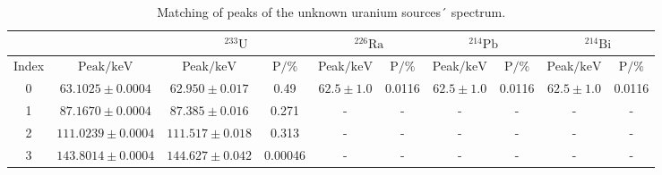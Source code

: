 \begin{table}[h!]
	\centering
	\caption{Matching of peaks of the unknown uranium sources´ spectrum.}
	\label{tab:urmatching}
	\begin{adjustbox}{width=1.3\textwidth, center}
		\begin{tabular}{S[table-format=2.0] S[table-format=4.4] S[table-format=3.3] S[table-format=1.5] S[table-format=3.2] S[table-format=1.4] S[table-format=3.2] S[table-format=1.4] S[table-format=3.2] S[table-format=1.4]}
			\toprule {} & {}                                      &  &  &  &                                                                                                                    \\
			\hline
			{Index}     & {$\text{Peak}/\si{\kilo\electronvolt}$} & {Peak$/\si{\kilo\electronvolt}$}     & {P$/\si{\percent}$}                   & {Peak$/\si{\kilo\electronvolt}$}      & {P$/\si{\percent}$}                   & {Peak$/\si{\kilo\electronvolt}$} & {P$/\si{\percent}$} & {Peak$/\si{\kilo\electronvolt}$} & {P$/\si{\percent}$} \\
			           & {$63.1025 \pm 0.0004$}                    & {$62.950 \pm 0.017$}                   & {0.49}                                & {$62.5 \pm 1.0$}                        & {0.0116}                              & {$62.5 \pm 1.0$}                   & {0.0116}            & {$62.5 \pm 1.0$}                   & {0.0116}            \\
			1           & {$87.1670 \pm 0.0004$}                    & {$87.385 \pm 0.016$}                   & {0.271}                               & {-}                                   & {-}                                   & {-}                              & {-}                 & {-}                              & {-}                 \\
			2           & {$111.0239 \pm 0.0004$}                   & {$111.517 \pm 0.018$}                  & {0.313}                               & {-}                                   & {-}                                   & {-}                              & {-}                 & {-}                              & {-}                 \\
			3           & {$143.8014 \pm 0.0004$}                   & {$144.627 \pm 0.042$}                  & {0.00046}                             & {-}                                   & {-}                                   & {-}                              & {-}                 & {-}                              & {-}                 \\

\end{tabular}
\end{adjustbox}
\end{table}
